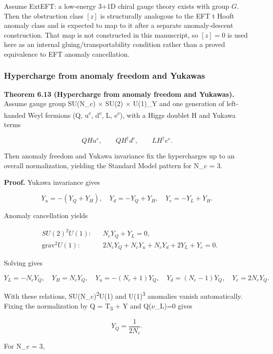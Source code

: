 Assume ExtEFT: a low-energy 3+1D chiral gauge theory exists with group \(G\). Then the obstruction class \([z]\) is structurally analogous to the EFT \textquotesingle t Hooft anomaly class and is expected to map to it after a separate anomaly-descent construction. That map is not constructed in this manuscript, so \([z]=0\) is used here as an internal gluing/transportability condition rather than a proved equivalence to EFT anomaly cancellation.

\subsubsection{Hypercharge from anomaly freedom and Yukawas}\label{68-hypercharge-from-anomaly-freedom-and-yukawas}

\textbf{Theorem 6.13 (Hypercharge from anomaly freedom and Yukawas).} Assume gauge group SU(N\_c) \ensuremath{\times} SU(2) \ensuremath{\times} U(1)\_Y and one generation of left-handed Weyl fermions (Q, u\textsuperscript{c}, d\textsuperscript{c}, L, e\textsuperscript{c}), with a Higgs doublet H and Yukawa terms

\[
Q H u^c,\qquad Q H^\dagger d^c,\qquad L H^\dagger e^c.
\]

Then anomaly freedom and Yukawa invariance fix the hypercharges up to an overall normalization, yielding the Standard Model pattern for N\_c = 3.

\textbf{Proof.} Yukawa invariance gives

\[
Y_u = -(Y_Q + Y_H),\quad
Y_d = -Y_Q + Y_H,\quad
Y_e = -Y_L + Y_H.
\]

Anomaly cancellation yields

\[
\begin{aligned}
&SU(2)^2 U(1): && N_c Y_Q + Y_L = 0,\\
&\mathrm{grav}^2 U(1): && 2 N_c Y_Q + N_c Y_u + N_c Y_d + 2 Y_L + Y_e = 0.
\end{aligned}
\]

Solving gives

\[
Y_L = -N_c Y_Q,\quad
Y_H = N_c Y_Q,\quad
Y_u = -(N_c + 1) Y_Q,\quad
Y_d = (N_c - 1) Y_Q,\quad
Y_e = 2 N_c Y_Q.
\]

With these relations, SU(N\_c)\textsuperscript{2}U(1) and U(1)\textsuperscript{3} anomalies vanish automatically. Fixing the normalization by Q = T\textsubscript{3} + Y and Q(\ensuremath{\nu}\_L)=0 gives

\[
Y_Q = \frac{1}{2 N_c}.
\]

For N\_c = 3,

